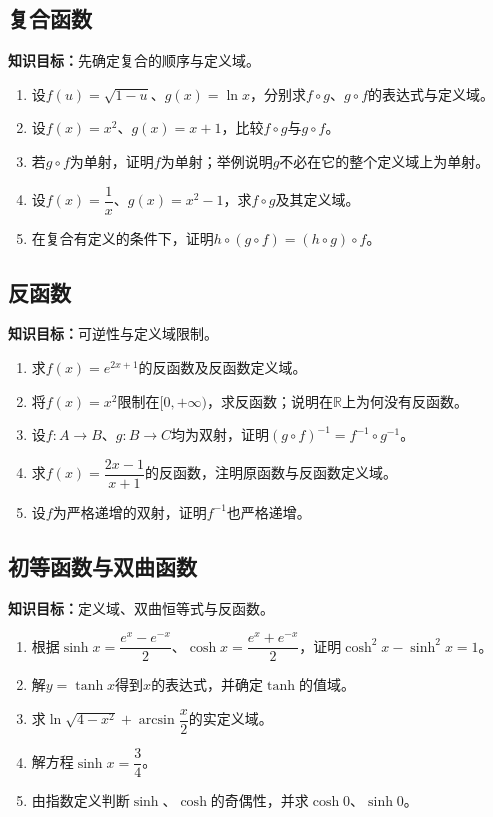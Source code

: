 \documentclass[11pt,a4paper,fontset=fandol]{ctexrep}
\newcommand{\goal}[1]{\textbf{知识目标：}#1\par}
\begin{document}
\subsection{复合函数}
\goal{先确定复合的顺序与定义域。}
\begin{enumerate}
\item 设$f(u)=\sqrt{1-u}$、$g(x)=\ln x$，分别求$f\circ g$、$g\circ f$的表达式与定义域。
\item 设$f(x)=x^2$、$g(x)=x+1$，比较$f\circ g$与$g\circ f$。
\item 若$g\circ f$为单射，证明$f$为单射；举例说明$g$不必在它的整个定义域上为单射。
\item 设$f(x)=\dfrac{1}{x}$、$g(x)=x^2-1$，求$f\circ g$及其定义域。
\item 在复合有定义的条件下，证明$h\circ(g\circ f)=(h\circ g)\circ f$。
\end{enumerate}
\subsection{反函数}
\goal{可逆性与定义域限制。}
\begin{enumerate}
\item 求$f(x)=e^{2x+1}$的反函数及反函数定义域。
\item 将$f(x)=x^2$限制在$[0,+\infty)$，求反函数；说明在$\mathbb R$上为何没有反函数。
\item 设$f:A\to B$、$g:B\to C$均为双射，证明$(g\circ f)^{-1}=f^{-1}\circ g^{-1}$。
\item 求$f(x)=\dfrac{2x-1}{x+1}$的反函数，注明原函数与反函数定义域。
\item 设$f$为严格递增的双射，证明$f^{-1}$也严格递增。
\end{enumerate}
\subsection{初等函数与双曲函数}
\goal{定义域、双曲恒等式与反函数。}
\begin{enumerate}
\item 根据$\sinh x=\dfrac{e^x-e^{-x}}{2}$、$\cosh x=\dfrac{e^x+e^{-x}}{2}$，证明$\cosh^2x-\sinh^2x=1$。
\item 解$y=\tanh x$得到$x$的表达式，并确定$\tanh$的值域。
\item 求$\ln\sqrt{4-x^2}+\arcsin\dfrac{x}{2}$的实定义域。
\item 解方程$\sinh x=\dfrac{3}{4}$。
\item 由指数定义判断$\sinh$、$\cosh$的奇偶性，并求$\cosh0$、$\sinh0$。
\end{enumerate}
\end{document}
